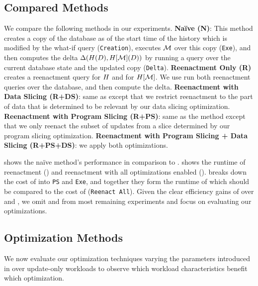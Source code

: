 %
%
%
%
%
%
%
%
%

\subsection{Compared Methods}
We compare the following methods in our experiments.
\textbf{Naïve (N)}: This method creates a copy of the database as of the start time of the history which is modified by the what-if query (\texttt{Creation}), executes $\mathcal{M}$ over this copy (\texttt{Exe}), and then computes the delta $\Delta(H(D),H[\mathcal{M}](D))$ by running a query over the current database state and the updated copy (\texttt{Delta}).
\textbf{Reenactment Only (R)} creates a reenactment query for $H$ and for $H[\mathcal{M}]$.
%
We use run both reenactment queries over the database, and then compute the delta. \textbf{Reenactment with Data Slicing (R+DS)}: same as \mr except that we restrict reenactment to the part of data that is determined to be relevant  by our data slicing optimization. \textbf{Reenactment with Program Slicing (R+PS)}: same as the \mr method except that we only reenact the subset of updates from a slice determined by our program slicing optimization. \textbf{Reenactment with Program Slicing + Data Slicing (R+PS+DS)}:  we apply both optimizations.

 shows the naïve method's performance in comparison to \mrdp.  shows the runtime of reenactment (\mr) and reenactment with all optimizations enabled (\mrdp).   breaks down the cost of \mrdp into \texttt{PS} and \texttt{Exe}, and together they form the runtime of \mrdp which should be compared to the cost of \mr (\texttt{Reenact All}). Given the clear efficiency gains of \mrdp over \mn and \mr, we omit \mn and \mr from most remaining experiments and focus on evaluating our optimizations.
%

%
%
%
%
%
%
%
%
%
%
%
%
%
%

%


\subsection{Optimization Methods}
We now evaluate our optimization techniques varying the parameters introduced in  over update-only workloads to observe which workload characteristics benefit which optimization.
%

